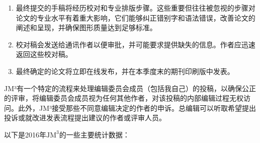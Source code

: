 \begin{enumerate}
\item 最终提交的手稿将经历校对和专业排版步骤。这些重要但往往被忽视的步骤对论文的专业水平有着重大影响，它们能够纠正错别字和语法错误，改善论文的阐述和呈现，并确保图形质量达到足够标准。

\item 校对稿会发送给通讯作者以便审批，并可能要求提供缺失的信息。作者应迅速返回这些校对稿。

\item 最终确定的论文将立即在线发布，并在本季度末的期刊印刷版中发表。

\end{enumerate}

JM³有一个特定的流程来处理编辑委员会成员（包括我自己）的投稿，以确保公正的评审，将编辑委员会成员视为任何其他作者，对该投稿的内部编辑过程无权访问。此外，JM³接受那些不同意编辑决定的作者的申诉。总编辑可以听取希望提出投诉或就改进发表流程提出建议的作者或评审人员。

以下是2016年$\mathrm{JM}^{3}$的一些主要统计数据：

